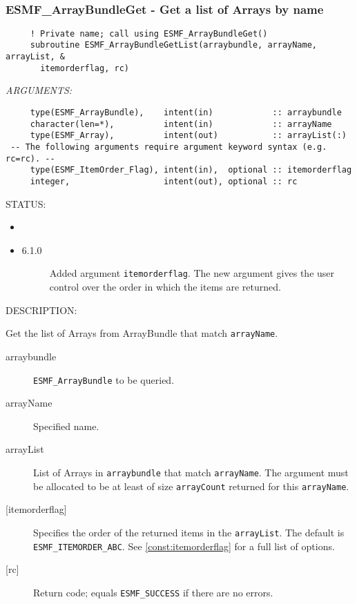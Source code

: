  
\mbox{}\hrulefill\ 
 
\subsubsection [ESMF\_ArrayBundleGet] {ESMF\_ArrayBundleGet - Get a list of Arrays by name}


  
\begin{verbatim}     ! Private name; call using ESMF_ArrayBundleGet()   
     subroutine ESMF_ArrayBundleGetList(arraybundle, arrayName, arrayList, &
       itemorderflag, rc)\end{verbatim}{\em ARGUMENTS:}
\begin{verbatim}     type(ESMF_ArrayBundle),    intent(in)            :: arraybundle
     character(len=*),          intent(in)            :: arrayName
     type(ESMF_Array),          intent(out)           :: arrayList(:)
 -- The following arguments require argument keyword syntax (e.g. rc=rc). --
     type(ESMF_ItemOrder_Flag), intent(in),  optional :: itemorderflag
     integer,                   intent(out), optional :: rc\end{verbatim}
{\sf STATUS:}
   \begin{itemize}
   \item{}
   \item{}
   \begin{description}
   \item[6.1.0] Added argument {\tt itemorderflag}.
                The new argument gives the user control over the order in which
                the items are returned.
   \end{description}
   \end{itemize}
  
{\sf DESCRIPTION:\\ }


     Get the list of Arrays from ArrayBundle that match {\tt arrayName}.
  
     \begin{description}
     \item [arraybundle]
       {\tt ESMF\_ArrayBundle} to be queried.
     \item [arrayName]
       Specified name.
     \item [arrayList]
       List of Arrays in {\tt arraybundle} that match {\tt arrayName}. The
       argument must be allocated to be at least of size {\tt arrayCount}
       returned for this {\tt arrayName}.
     \item[{[itemorderflag]}]
       Specifies the order of the returned items in the {\tt arrayList}.
       The default is {\tt ESMF\_ITEMORDER\_ABC}.
       See \ref{const:itemorderflag} for a full list of options.
     \item [{[rc]}]
       Return code; equals {\tt ESMF\_SUCCESS} if there are no errors.
     \end{description}
   
